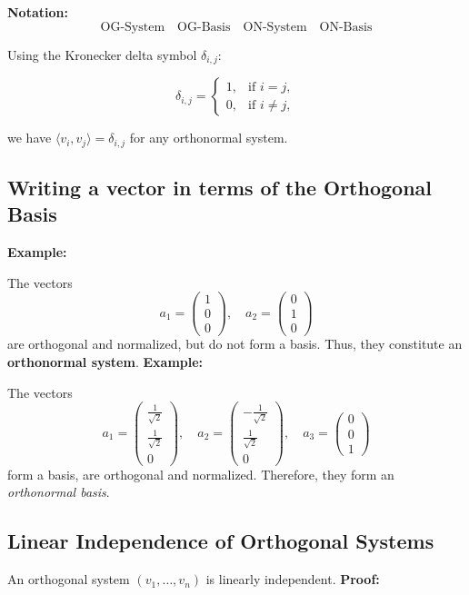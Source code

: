 \textbf{Notation:}
\[
\text{OG-System} \quad \text{OG-Basis} \quad \text{ON-System} \quad \text{ON-Basis}
\]

Using the Kronecker delta symbol \( \delta_{i,j} \):

\[
\delta_{i,j} =
\begin{cases}
1, & \text{if } i = j, \\
0, & \text{if } i \neq j,
\end{cases}
\]

we have \( \langle v_i, v_j \rangle = \delta_{i,j} \) for any orthonormal system.

\subsection{Writing a vector in terms of the Orthogonal Basis}
\textbf{Example:} 

The vectors
\[
a_1 =
\begin{pmatrix}
1 \\
0 \\
0
\end{pmatrix}, \quad
a_2 =
\begin{pmatrix}
0 \\
1 \\
0
\end{pmatrix}
\]
are orthogonal and normalized, but do not form a basis. Thus, they constitute an \textbf{orthonormal system}.
\newline
\textbf{Example:} 

The vectors
\[
a_1 =
\begin{pmatrix}
\frac{1}{\sqrt{2}} \\
\frac{1}{\sqrt{2}} \\
0
\end{pmatrix}, \quad
a_2 =
\begin{pmatrix}
-\frac{1}{\sqrt{2}} \\
\frac{1}{\sqrt{2}} \\
0
\end{pmatrix}, \quad
a_3 =
\begin{pmatrix}
0 \\
0 \\
1
\end{pmatrix}
\]
form a basis, are orthogonal and normalized. Therefore, they form an \emph{orthonormal basis}.

\subsection{Linear Independence of Orthogonal Systems}
An orthogonal system \( (v_1, \ldots, v_n) \) is linearly independent.
\newline
\textbf{Proof:} 

